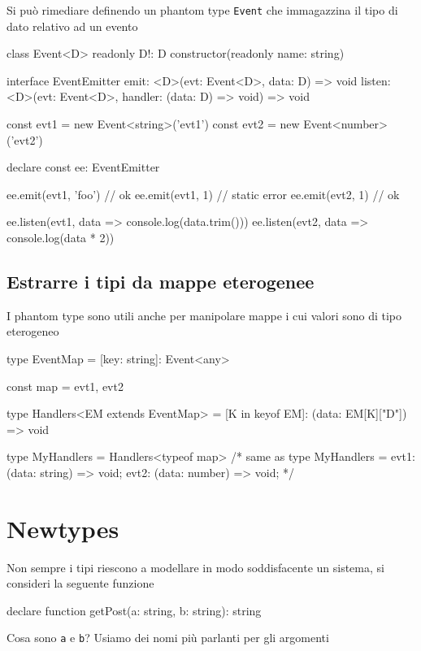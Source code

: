 \documentclass[12pt]{article}
\theoremstyle{definition}
\newenvironment{code}
  {\vspace{0.5cm} \VerbatimEnvironment\begin{typescriptcode}}
  {\end{typescriptcode} \vspace{0.2cm}}
\begin{document}
Si può rimediare definendo un phantom type \texttt{Event} che immagazzina il tipo di dato relativo ad un evento

\begin{code}
class Event<D> {
  readonly D!: D
  constructor(readonly name: string) {}
}

interface EventEmitter {
  emit: <D>(evt: Event<D>, data: D) => void
  listen: <D>(evt: Event<D>, handler: (data: D) => void) => void
}

const evt1 = new Event<string>('evt1')
const evt2 = new Event<number>('evt2')

declare const ee: EventEmitter

ee.emit(evt1, 'foo') // ok
ee.emit(evt1, 1) // static error
ee.emit(evt2, 1) // ok

ee.listen(evt1, data => console.log(data.trim()))
ee.listen(evt2, data => console.log(data * 2))
\end{code}

\subsection{Estrarre i tipi da mappe eterogenee}

I phantom type sono utili anche per manipolare mappe i cui valori sono di tipo eterogeneo

\begin{code}
type EventMap = { [key: string]: Event<any> }

const map = {
  evt1,
  evt2
}

type Handlers<EM extends EventMap> = {
  [K in keyof EM]: (data: EM[K]["D"]) => void
}

type MyHandlers = Handlers<typeof map>
/* same as
type MyHandlers = {
    evt1: (data: string) => void;
    evt2: (data: number) => void;
}
*/
\end{code}

\newpage
\section{Newtypes}

Non sempre i tipi riescono a modellare in modo soddisfacente un sistema, si consideri la seguente funzione

\begin{code}
declare function getPost(a: string, b: string): string
\end{code}

Cosa sono \texttt{a} e \texttt{b}? Usiamo dei nomi più parlanti per gli argomenti
\end{document}
